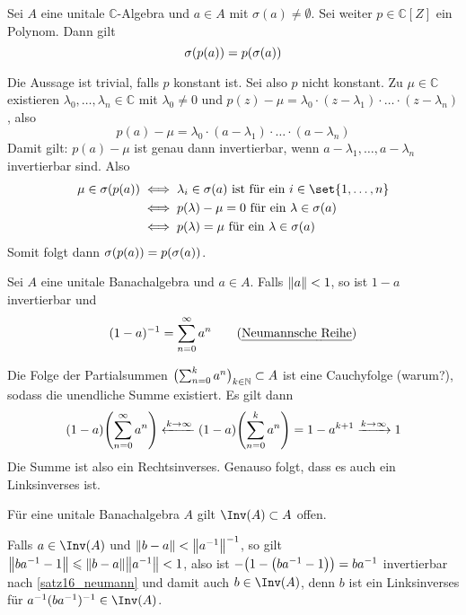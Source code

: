 \begin{satz}
	Sei $A$ eine unitale $\mathds{C}$-Algebra und $a \in A$ mit $\sigma(a)\not= \emptyset$. Sei weiter $p \in \mathds{C}[Z]$ ein Polynom. Dann gilt 
	\[
		\sigma\enbrace*{p(a) }= p \enbrace*{\sigma(a)}
	\]
\end{satz}
\begin{beweis}
	Die Aussage ist trivial, falls $p$ konstant ist. Sei also $p$ nicht konstant. Zu $\mu \in \mathds{C}$ existieren $\lambda_0, \ldots , \lambda_n \in \mathds{C}$ mit 
	$\lambda_0 \not= 0$ und $p(z) -\mu = \lambda_0 \cdot (z- \lambda_1) \cdot  \ldots \cdot (z- \lambda_n)$, also
	\[
		p(a) - \mu = \lambda_0 \cdot (a-\lambda_1) \cdot  \ldots \cdot (a- \lambda_n)
	\]
	Damit gilt: $p(a) -\mu$ ist genau dann invertierbar, wenn $a -\lambda_1, \ldots , a-\lambda_n $ invertierbar sind. Also 
	\begin{align}
		\mu \in \sigma \enbrace*{p(a)} &\iff \lambda_i \in \sigma(a) \text{ ist für ein } i \in \set{1,\ldots ,n} \\
		&\iff p(\lambda) -\mu =0 \text{ für ein } \lambda \in \sigma(a) \\
		&\iff p(\lambda)=\mu \text{ für ein } \lambda \in \sigma(a)   
	\end{align}
	Somit folgt dann $\sigma \enbrace*{p(a)} = p \enbrace*{\sigma(a)}$.
\end{beweis}

\begin{satz}[label=satz16_neumann]
	Sei $A$ eine unitale Banachalgebra und $a \in A$. Falls $\norm{a}<1$, so ist $1-a$ invertierbar und 
	\[
		(1-a)^{-1} = \sum_{n=0}^{\infty} a^n \tag*{(\Index{Neumannsche Reihe})}
	\]
\end{satz}
\begin{beweis}
	Die Folge der Partialsummen $\enbrace[\big]{\sum_{n=0}^{k} a^n}_{k \in \mathds{N}} \subset A$ ist eine Cauchyfolge (warum?), sodass die unendliche Summe existiert. Es gilt dann
	\begin{align}
		(1-a) \enbrace*{\sum_{n=0}^{\infty} a^n} \xleftarrow{k \to \infty}(1-a) \enbrace*{\sum_{n=0}^{k} a^n} = 1-a^{k+1} \xrightarrow{k \to \infty} 1
	\end{align}
	Die Summe ist also ein Rechtsinverses. Genauso folgt, dass es auch ein Linksinverses ist.
\end{beweis}

\begin{korollar}
	Für eine unitale Banachalgebra $A$ gilt $\Inv(A) \subset A$ offen.
\end{korollar}
\begin{beweis}
	Falls $a \in \Inv(A)$ und $\norm{b-a} < \norm{a^{-1}}^{-1}$, so gilt $\norm{b a^{-1} -1} \le \norm{b-a} \norm{a^{-1}}<1$, also ist 
	$-\enbrace*{1- \enbrace*{ba^{-1} -1}} = ba^{-1}$ invertierbar nach \autoref{satz16_neumann} und damit auch $b \in \Inv(A)$, denn $b$ ist ein Linksinverses für 
	$a^{-1}(ba^{-1})^{-1} \in \Inv(A)$.
\end{beweis}






\cleardoubleoddemptypage
{}
\setcounter{page}{1}

\printindex
\listoffigures
\todototoc
{}
